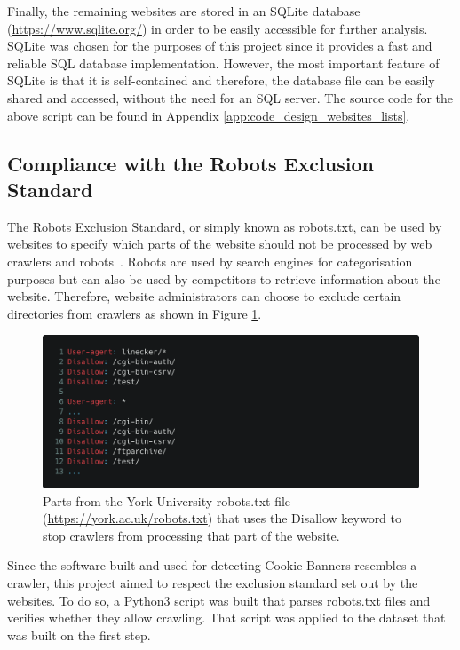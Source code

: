 \documentclass[../main.tex]{subfiles}
\begin{document}
Finally, the remaining websites are stored in an SQLite database (\url{https://www.sqlite.org/}) in order to be easily accessible for further analysis. SQLite was chosen for the purposes of this project since it provides a fast and reliable SQL database implementation. However, the most important feature of SQLite is that it is self-contained and therefore, the database file can be easily shared and accessed, without the need for an SQL server. The source code for the above script can be found in Appendix \ref{app:code_design_websites_lists}.

\subsection{Compliance with the Robots Exclusion Standard}
The Robots Exclusion Standard, or simply known as robots.txt, can be used by websites to specify which parts of the website should not be processed by web crawlers and robots~\cite{koster_1994}. Robots are used by search engines for categorisation purposes but can also be used by competitors to retrieve information about the website. Therefore, website administrators can choose to exclude certain directories from crawlers as shown in Figure \ref{fig:design_example_robots}. 

\begin{figure}[ht]
    \centering
    \includegraphics[width=\textwidth]{images/implementation/example_robots.png}
    \caption{Parts from the York University robots.txt file (\url{https://york.ac.uk/robots.txt}) that uses the Disallow keyword to stop crawlers from processing that part of the website.}
    \label{fig:design_example_robots}
\end{figure}

Since the software built and used for detecting Cookie Banners resembles a crawler, this project aimed to respect the exclusion standard set out by the websites. To do so, a Python3 script was built that parses robots.txt files and verifies whether they allow crawling. That script was applied to the dataset that was built on the first step.
\end{document}
